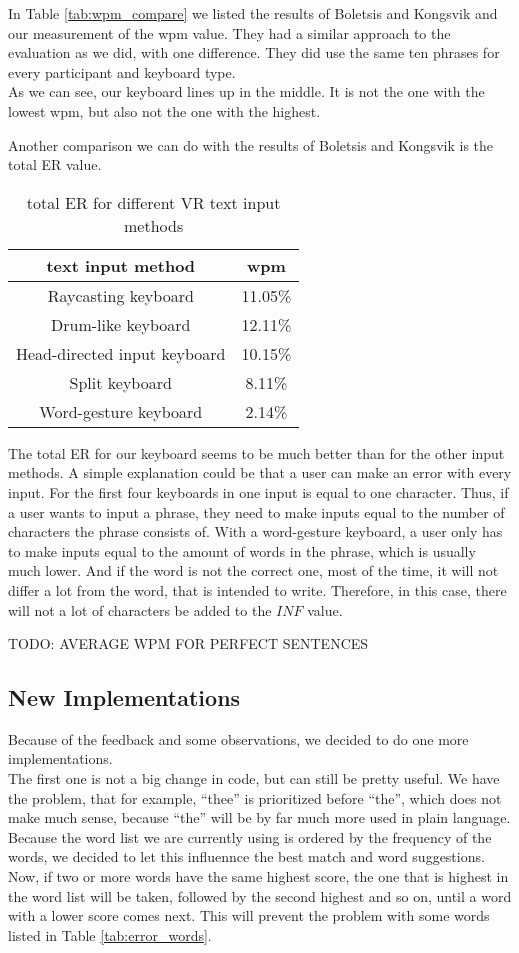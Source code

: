 In Table \ref{tab:wpm_compare} we listed the results of Boletsis and Kongsvik \cite{Boletsis2019ControllerbasedTT} and our measurement of the wpm value. They had a similar approach to the evaluation as we did, with one difference. They did use the same ten phrases for every participant and keyboard type.\\
As we can see, our keyboard lines up in the middle. It is not the one with the lowest wpm, but also not the one with the highest.

Another comparison we can do with the results of Boletsis and Kongsvik \cite{Boletsis2019ControllerbasedTT} is the total ER value.
\begin{table}[ht!]
    \centering
    \caption{total ER for different VR text input methods}
    \begin{tabular}{cc} \toprule
        text input method&wpm\\ \midrule
        Raycasting keyboard& 11.05\%\\
        Drum-like keyboard& 12.11\%\\
        Head-directed input keyboard& 10.15\%\\
        Split keyboard& 8.11\%\\
        Word-gesture keyboard& 2.14\%\\
        \bottomrule
    \end{tabular}
    \label{tab:total_er_compare}
\end{table}
The total ER for our keyboard seems to be much better than for the other input methods. A simple explanation could be that a user can make an error with every input. For the first four keyboards in  one input is equal to one character. Thus, if a user wants to input a phrase, they need to make inputs equal to the number of characters the phrase consists of. With a word-gesture keyboard, a user only has to make inputs equal to the amount of words in the phrase, which is usually much lower. And if the word is not the correct one, most of the time, it will not differ a lot from the word, that is intended to write. Therefore, in this case, there will not a lot of characters be added to the $INF$ value.

TODO: AVERAGE WPM FOR PERFECT SENTENCES

\subsection{New Implementations}
Because of the feedback and some observations, we decided to do one more implementations.\\
The first one is not a big change in code, but can still be pretty useful. We have the problem, that for example, ``thee'' is prioritized before ``the'', which does not make much sense, because ``the'' will be by far much more used in plain language. Because the word list we are currently using is ordered by the frequency of the words, we decided to let this influennce the best match and word suggestions. Now, if two or more words have the same highest score, the one that is highest in the word list will be taken, followed by the second highest and so on, until a word with a lower score comes next. This will prevent the problem with some words listed in Table \ref{tab:error_words}.